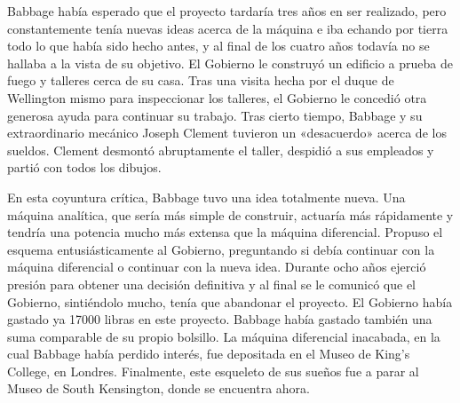 \documentclass[a4paper, 12pt]{article}
\begin{document}
Babbage había esperado que el proyecto tardaría tres años en ser realizado, pero constantemente tenía nuevas ideas acerca de la máquina e iba echando por tierra todo lo que había sido hecho antes, y al final de los cuatro años todavía no se hallaba a la vista de su objetivo. El Gobierno le construyó un edificio a prueba de fuego y talleres cerca de su casa. Tras una visita hecha por el duque de Wellington mismo para inspeccionar los talleres, el Gobierno le concedió otra generosa ayuda  para continuar su trabajo. Tras cierto tiempo, Babbage y su extraordinario mecánico Joseph Clement tuvieron un «desacuerdo» acerca de los sueldos. Clement desmontó abruptamente el taller, despidió a sus empleados y partió con todos los dibujos.

En esta coyuntura crítica, Babbage tuvo una idea totalmente nueva. Una máquina analítica, que sería más simple de construir, actuaría más rápidamente y tendría una potencia mucho más extensa que la máquina diferencial. Propuso el esquema entusiásticamente al Gobierno, preguntando si debía continuar con la máquina diferencial o continuar con la nueva idea. Durante ocho años ejerció presión para obtener una decisión definitiva y al final se le comunicó que el Gobierno, sintiéndolo mucho, tenía que abandonar el proyecto. El Gobierno había gastado ya 17000 libras en este proyecto. Babbage había gastado también una suma comparable de su propio bolsillo. La máquina diferencial inacabada, en la cual Babbage había perdido interés, fue depositada en el Museo de King's College, en Londres. Finalmente, este esqueleto de sus sueños fue a parar al Museo de South Kensington, donde se encuentra ahora.
\end{document}
